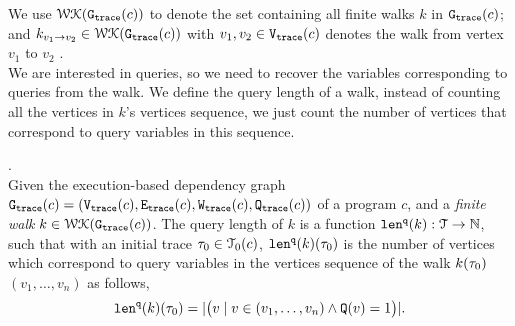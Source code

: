 We use $\mathcal{WK}(\mathtt{{G_{trace}}}(c))$ to denote 
the set containing all finite walks $k$ in $\mathtt{{G_{trace}}}(c)$;
and $k_{v_1 \to v_2} \in \mathcal{WK}(\mathtt{{G_{trace}}}(c))$ with $v_1, v_2 \in \mathtt{{V_{trace}}}(c)$ denotes the walk from vertex $v_1$ to $v_2$ . 
\\
We are interested in queries, so we need to recover the 
variables corresponding to queries from the walk. We define the query length of a walk, 
instead of counting all 
the vertices in $k$'s vertices sequence, we just count the number of vertices that correspond to query variables in this sequence.
%
\begin{defn}.
\label{def:qlen}
\\
Given 
the execution-based dependency graph $\mathtt{{G_{trace}}}({c}) = (\mathtt{{V_{trace}}}({c}), \mathtt{{E_{trace}}}({c}), \mathtt{{W_{trace}}}({c}), \mathtt{{Q_{trace}}}({c}))$ of a program $c$,
 and a \emph{finite walk} 
 $k \in \mathcal{WK}(\mathtt{{G_{trace}}}(c))$. 
The query length of $k$ is a function $\mathtt{len}^{\tt q}(k): \mathcal{T} \to \mathbb{N}$, such that with an initial trace $\mathtt{\tau}_0 \in \mathcal{T}_0(c)$, $\mathtt{len}^{\tt q}(k)(\mathtt{\tau}_0)$ is
the number of vertices which correspond to query variables in the vertices sequence of the walk $k(\mathtt{\tau}_0)$
$(v_1, \ldots, v_{n})$ as follows, 
\[
 \mathtt{len}^{\tt q}(k)(\mathtt{\tau}_0) = |\big( v \mid v \in (v_1, \ldots, v_{n}) \land \mathtt{Q}(v) = 1 \big)|.
\]
\end{defn}
